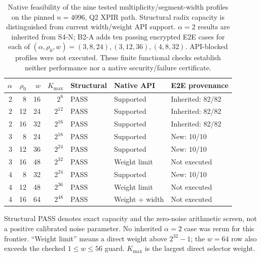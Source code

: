 \begin{table}[t]
\centering
\caption{Native feasibility of the nine tested multiplicity/segment-width
profiles on the pinned $n=4096$, Q2 XPIR path. Structural radix capacity is
distinguished from current width/weight API support. $\alpha=2$ results are
inherited from S4-N; B2-A adds ten passing encrypted E2E cases for each of
$(\alpha,\rho_0,w)=(3,8,24),(3,12,36),(4,8,32)$. API-blocked profiles were
not executed. These finite functional checks establish neither performance
nor a native security/failure certificate.}
\label{tab:native-frontier}
\small
\setlength{\tabcolsep}{4pt}
\begin{tabular}{@{}rrrrlll@{}}
\toprule
$\alpha$ & $\rho_0$ & $w$ & $K_{\max}$ & Structural & Native API & E2E provenance \\
\midrule
2 & 8 & 16 & $2^{8}$ & PASS & Supported & Inherited: 82/82 \\
2 & 12 & 24 & $2^{12}$ & PASS & Supported & Inherited: 82/82 \\
2 & 16 & 32 & $2^{16}$ & PASS & Supported & Inherited: 82/82 \\
3 & 8 & 24 & $2^{16}$ & PASS & Supported & New: 10/10 \\
3 & 12 & 36 & $2^{24}$ & PASS & Supported & New: 10/10 \\
3 & 16 & 48 & $2^{32}$ & PASS & Weight limit & Not executed \\
4 & 8 & 32 & $2^{24}$ & PASS & Supported & New: 10/10 \\
4 & 12 & 48 & $2^{36}$ & PASS & Weight limit & Not executed \\
4 & 16 & 64 & $2^{48}$ & PASS & Weight + width & Not executed \\
\bottomrule
\end{tabular}
\par\smallskip
\begin{minipage}{\linewidth}\footnotesize
Structural PASS denotes exact capacity and the zero-noise arithmetic
screen, not a positive calibrated noise parameter. No inherited
$\alpha=2$ case was rerun for this frontier. ``Weight limit'' means a
direct weight above $2^{32}-1$; the $w=64$ row also exceeds the checked
$1\le w\le56$ guard. $K_{\max}$ is the largest direct selector weight.
\end{minipage}
\end{table}

